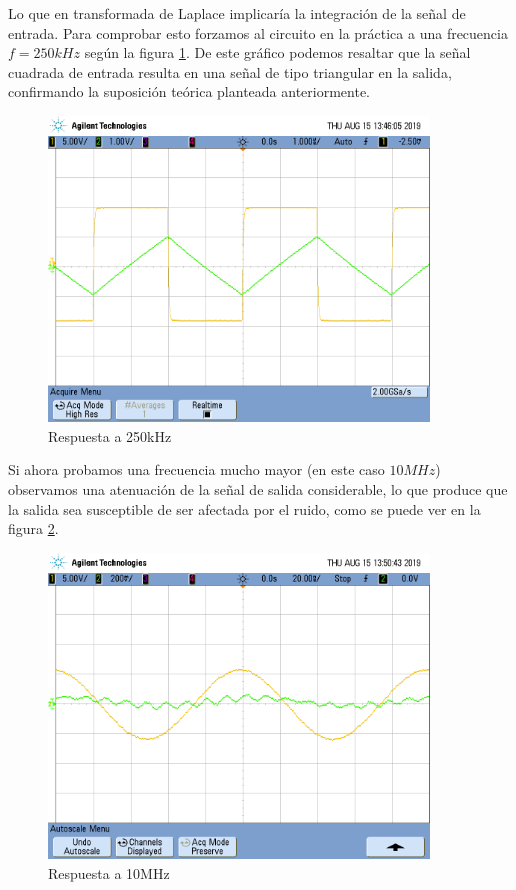 Lo que en transformada de Laplace implicar\'ia la integraci\'on de la se\~nal de entrada. Para comprobar esto forzamos al circuito en la pr\'actica a una frecuencia $f=250kHz$ seg\'un la figura \ref{fig:altafrec_2}. De este gr\'afico podemos resaltar que la se\~nal cuadrada de entrada resulta en una se\~nal de tipo triangular en la salida, confirmando la suposici\'on te\'orica planteada anteriormente.

\begin{figure}[H]
    \centering
    \includegraphics[width=0.9\textwidth]{./EJ2/EJ2_integrador.png}
    \caption{Respuesta a 250kHz}
    \label{fig:altafrec_2} 
\end{figure}

\quad \quad Si ahora probamos una frecuencia mucho mayor (en este caso $10MHz$) observamos una atenuaci\'on de la se\~nal de salida considerable, lo que produce que la salida sea susceptible de ser afectada por el ruido, como se puede ver en la figura \ref{fig:noise_2}.
 
 \begin{figure}[H]
    \centering
    \includegraphics[width=0.9\textwidth]{./EJ2/EJ2_rta_alta_frec.png}
    \caption{Respuesta a 10MHz}
    \label{fig:noise_2}
\end{figure}
 
